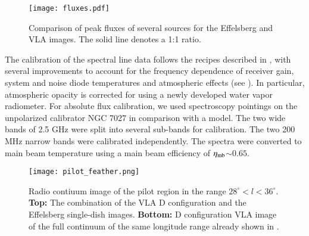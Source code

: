\documentclass{aa}
\begin{document}
\begin{figure}
\texttt{[image: fluxes.pdf]}
\caption{Comparison of peak fluxes of several sources for the Effelsberg and VLA images. The solid line denotes a 1:1 ratio.}
\label{fig:fluxes}
\end{figure}

The calibration of the spectral line data follows the recipes described in \cite{Kraus:2009aa}, with several improvements to account for the frequency dependence of receiver gain, system and noise diode temperatures and atmospheric effects (see \citealp{Winkel2012b}). In particular, atmospheric opacity is corrected for using a newly developed water vapor radiometer. For absolute flux calibration, we used spectroscopy pointings on the unpolarized calibrator NGC 7027 in comparison with a model. The two wide bands of 2.5 GHz were split into several sub-bands for calibration. The two 200 MHz narrow bands were calibrated independently. The spectra were converted to main beam temperature using a main beam efficiency of $\eta_{\rm mb}$$\sim$$0.65$.

\begin{figure*}
\texttt{[image: pilot\_feather.png]}
\caption{Radio contiuum image of the pilot region in the range $28^\circ<l<36^\circ$. {\bf Top:} The combination of the VLA D configuration and the Effelsberg single-dish images. {\bf Bottom:} D configuration VLA image of the full continuum of the same longitude range already shown in \cite{Medina2019}.}
\label{fig:cont}
\end{figure*}
\end{document}
